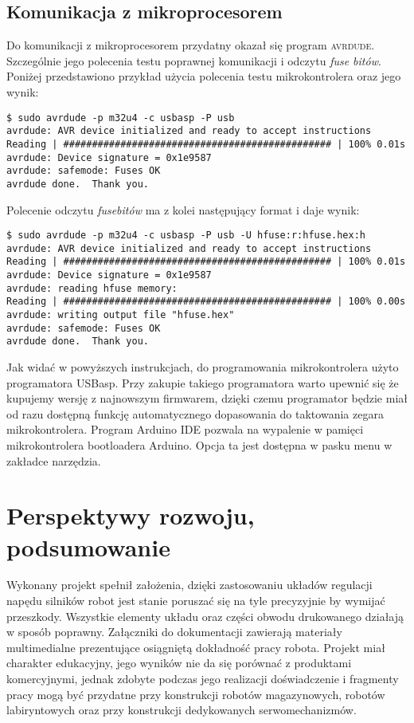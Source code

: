 \documentclass[11pt]{article}
\begin{document}
\subsection{Komunikacja z mikroprocesorem}
Do komunikacji z mikroprocesorem przydatny okazał się program \textsc{avrdude}. Szczególnie jego polecenia testu poprawnej komunikacji i odczytu \textit{fuse bitów}. Poniżej przedstawiono przykład użycia polecenia testu mikrokontrolera oraz jego wynik:

\begin{verbatim}
$ sudo avrdude -p m32u4 -c usbasp -P usb
avrdude: AVR device initialized and ready to accept instructions
Reading | ############################################### | 100% 0.01s
avrdude: Device signature = 0x1e9587
avrdude: safemode: Fuses OK
avrdude done.  Thank you.
\end{verbatim}
Polecenie odczytu \textit{fusebitów} ma z kolei następujący format i daje wynik:
\begin{verbatim}
$ sudo avrdude -p m32u4 -c usbasp -P usb -U hfuse:r:hfuse.hex:h
avrdude: AVR device initialized and ready to accept instructions
Reading | ############################################### | 100% 0.01s
avrdude: Device signature = 0x1e9587
avrdude: reading hfuse memory:
Reading | ############################################### | 100% 0.00s
avrdude: writing output file "hfuse.hex"
avrdude: safemode: Fuses OK
avrdude done.  Thank you.
\end{verbatim}
Jak widać w powyższych instrukcjach, do programowania mikrokontrolera użyto programatora USBasp.
Przy zakupie takiego programatora warto upewnić się że kupujemy wersję z najnowszym firmwarem, dzięki czemu programator będzie miał od razu dostępną funkcję automatycznego dopasowania do taktowania zegara mikrokontrolera.
Program Arduino IDE pozwala na wypalenie w pamięci mikrokontrolera bootloadera Arduino. Opcja ta jest dostępna w pasku menu w zakładce narzędzia.

\section{Perspektywy rozwoju, podsumowanie}
Wykonany projekt spełnił założenia, dzięki zastosowaniu układów regulacji napędu silników robot jest stanie poruszać się na tyle precyzyjnie by wymijać przeszkody.
Wszystkie elementy układu oraz części obwodu drukowanego działają w sposób poprawny.
Załączniki do dokumentacji zawierają materiały multimedialne prezentujące osiągniętą dokładność pracy robota.
Projekt miał charakter edukacyjny, jego wyników nie da się porównać z produktami komercyjnymi, jednak zdobyte podczas jego realizacji doświadczenie i fragmenty pracy mogą być przydatne przy konstrukcji robotów magazynowych, robotów labiryntowych oraz przy konstrukcji dedykowanych serwomechanizmów.
\end{document}
